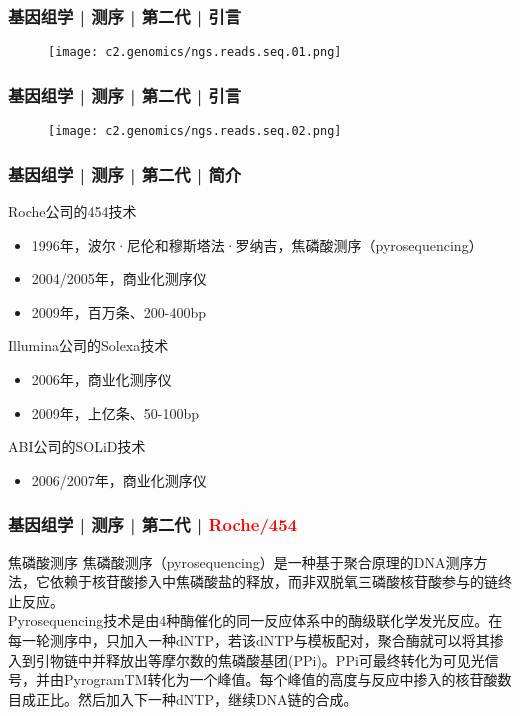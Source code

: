 \begin{frame}
  \frametitle{基因组学 | 测序 | 第二代 | 引言}
  \begin{figure}
    \centering
    \texttt{[image: c2.genomics/ngs.reads.seq.01.png]}
  \end{figure}
\end{frame}

\begin{frame}
  \frametitle{基因组学 | 测序 | 第二代 | 引言}
  \begin{figure}
    \centering
    \texttt{[image: c2.genomics/ngs.reads.seq.02.png]}
  \end{figure}
\end{frame}

\begin{frame}
  \frametitle{基因组学 | 测序 | 第二代 | 简介}
  \begin{block}{Roche公司的454技术}
  \begin{itemize}
    \item 1996年，波尔·尼伦和穆斯塔法·罗纳吉，焦磷酸测序（pyrosequencing）
    \item 2004/2005年，商业化测序仪
    \item 2009年，百万条、200-400bp
  \end{itemize}
  \end{block}
  \pause
  \begin{block}{Illumina公司的Solexa技术}
  \begin{itemize}
    \item 2006年，商业化测序仪
    \item 2009年，上亿条、50-100bp
  \end{itemize}
  \end{block}
  \pause
  \begin{block}{ABI公司的SOLiD技术}
  \begin{itemize}
    \item 2006/2007年，商业化测序仪
  \end{itemize}
  \end{block}
\end{frame}

\begin{frame}
  \frametitle{基因组学 | 测序 | 第二代 | \textcolor{red}{Roche/454}}
  \begin{block}{焦磷酸测序}
焦磷酸测序（pyrosequencing）是一种基于聚合原理的DNA测序方法，它依赖于核苷酸掺入中焦磷酸盐的释放，而非双脱氧三磷酸核苷酸参与的链终止反应。\\
\vspace{1em}
Pyrosequencing技术是由4种酶催化的同一反应体系中的酶级联化学发光反应。在每一轮测序中，只加入一种dNTP，若该dNTP与模板配对，聚合酶就可以将其掺入到引物链中并释放出等摩尔数的焦磷酸基团(PPi)。PPi可最终转化为可见光信号，并由PyrogramTM转化为一个峰值。每个峰值的高度与反应中掺入的核苷酸数目成正比。然后加入下一种dNTP，继续DNA链的合成。
  \end{block}
\end{frame}

